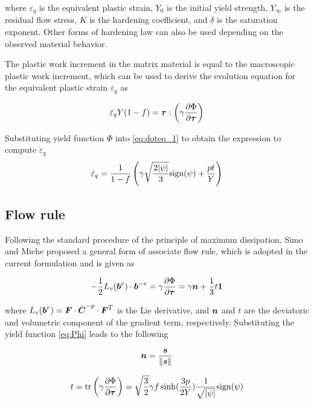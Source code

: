 where $\varepsilon_q$ is the equivalent plastic strain, $Y_0$ is the
initial yield strength, $Y_{\infty}$ is the residual flow stress, $K$
is the hardening coefficient, and $\delta$ is the saturation
exponent. Other forms of hardening law can also be used depending on
the observed material behavior.

The plastic work increment in the matrix material is equal to the
macroscopic plastic work increment, which can be used to derive the
evolution equation for the equivalent plastic strain $\varepsilon_q$
as

\begin{equation}\label{eq:doteq_1}
\dot{\varepsilon}_q Y(1-f) = {\boldsymbol{\tau}} : \left(
\gamma\frac{\partial\Phi}{\partial{\boldsymbol{\tau}}} \right)
\end{equation}

Substituting yield function $\Phi$ into \eqref{eq:doteq_1} to obtain
the expression to compute $\dot{\varepsilon}_q$
\begin{equation}\label{eq:doteq}
  \dot{\varepsilon}_q =\frac{1}{1-f}\left(
  \gamma\sqrt{\frac{2|\psi|}{3}} {\rm sign}(\psi) + \frac{p t}{Y}
  \right)
\end{equation}


\subsection{Flow rule}
Following the standard procedure of the principle of maximum
dissipation, Simo and Miehe \cite{Simo1992} proposed a general form 
of associate flow rule, which is adopted in the current formulation 
and is given as

\begin{equation}\label{eq:flowRule}
-\frac{1}{2}L_v({\boldsymbol{b}}^e)\cdot{\boldsymbol{b}}^{-e} =
\gamma\frac{\partial\Phi}{\partial{\boldsymbol{\tau}}}=\gamma{\boldsymbol{n}} +
\frac{1}{3}t\boldsymbol{1}
\end{equation}

where $L_v({\boldsymbol{b}}^e)={\boldsymbol{F}} \cdot \dot{{\boldsymbol{C}}}^{-p} \cdot {\boldsymbol{F}}^T$ is the Lie
derivative, and ${\boldsymbol{n}}$ and $t$ are the deviatoric and volumetric
component of the gradient term, respectively. Substituting the yield
function \eqref{eq:Phi} leads to the following

\begin{equation}\label{eq:n}
{\boldsymbol{n}} = \frac{{\boldsymbol{s}}}{\|{\boldsymbol{s}}\|}
\end{equation}

\begin{equation}\label{eq:t}
t = \operatorname{\text{tr}} \left( \gamma \frac{\partial\Phi}{\partial{\boldsymbol{\tau}}}\right) =
\sqrt{\frac{3}{2}}\gamma f \sinh (\frac{3p}{2
  Y})\frac{1}{\sqrt{|\psi|}} {\rm sign}(\psi)
\end{equation}



